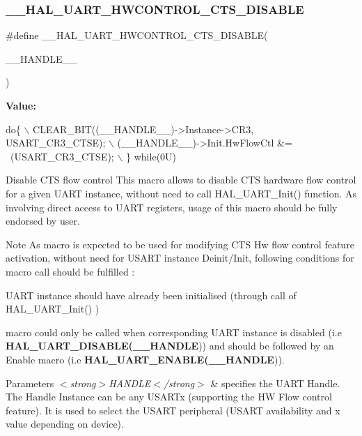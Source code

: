 \subsubsection{\texorpdfstring{\+\_\+\+\_\+\+H\+A\+L\+\_\+\+U\+A\+R\+T\+\_\+\+H\+W\+C\+O\+N\+T\+R\+O\+L\+\_\+\+C\+T\+S\+\_\+\+D\+I\+S\+A\+B\+LE}{\_\_HAL\_UART\_HWCONTROL\_CTS\_DISABLE}}
{\footnotesize\ttfamily \#define \+\_\+\+\_\+\+H\+A\+L\+\_\+\+U\+A\+R\+T\+\_\+\+H\+W\+C\+O\+N\+T\+R\+O\+L\+\_\+\+C\+T\+S\+\_\+\+D\+I\+S\+A\+B\+LE(\begin{DoxyParamCaption}\item[{}]{\+\_\+\+\_\+\+H\+A\+N\+D\+L\+E\+\_\+\+\_\+ }\end{DoxyParamCaption})}

{\bfseries Value\+:}
\begin{DoxyCode}
\textcolor{keywordflow}{do}\{                                                       \(\backslash\)
    CLEAR\_BIT((\_\_HANDLE\_\_)->Instance->CR3, USART\_CR3\_CTSE); \(\backslash\)
    (\_\_HANDLE\_\_)->Init.HwFlowCtl &= ~(USART\_CR3\_CTSE);      \(\backslash\)
  \} \textcolor{keywordflow}{while}(0U)
\end{DoxyCode}


Disable C\+TS flow control This macro allows to disable C\+TS hardware flow control for a given U\+A\+RT instance, without need to call H\+A\+L\+\_\+\+U\+A\+R\+T\+\_\+\+Init() function. As involving direct access to U\+A\+RT registers, usage of this macro should be fully endorsed by user. 

\begin{DoxyNote}{Note}
As macro is expected to be used for modifying C\+TS Hw flow control feature activation, without need for U\+S\+A\+RT instance Deinit/\+Init, following conditions for macro call should be fulfilled \+:
\begin{DoxyItemize}
\item U\+A\+RT instance should have already been initialised (through call of H\+A\+L\+\_\+\+U\+A\+R\+T\+\_\+\+Init() )
\item macro could only be called when corresponding U\+A\+RT instance is disabled (i.\+e {\bfseries H\+A\+L\+\_\+\+U\+A\+R\+T\+\_\+\+D\+I\+S\+A\+B\+LE(\+\_\+\+\_\+\+H\+A\+N\+D\+LE})) and should be followed by an Enable macro (i.\+e {\bfseries H\+A\+L\+\_\+\+U\+A\+R\+T\+\_\+\+E\+N\+A\+B\+LE(\+\_\+\+\_\+\+H\+A\+N\+D\+LE})). 
\end{DoxyItemize}
\end{DoxyNote}

\begin{DoxyParams}{Parameters}
{\em $<$strong$>$\+H\+A\+N\+D\+L\+E$<$/strong$>$} & specifies the U\+A\+RT Handle. The Handle Instance can be any U\+S\+A\+R\+Tx (supporting the HW Flow control feature). It is used to select the U\+S\+A\+RT peripheral (U\+S\+A\+RT availability and x value depending on device). \\
\hline
\end{DoxyParams}


